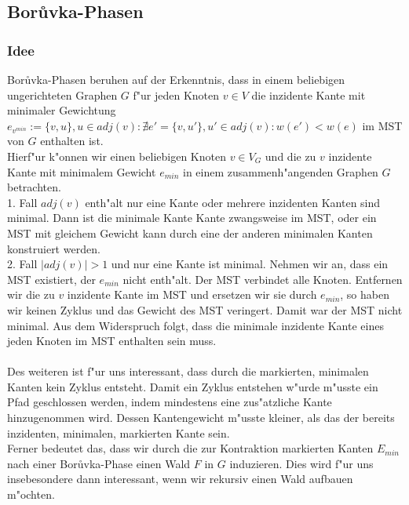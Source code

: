 \subsection{Bor\r uvka-Phasen}

\subsubsection{Idee}
\label{sec:borIdea}

Bor\r uvka-Phasen beruhen auf der Erkenntnis, dass in einem beliebigen 
    ungerichteten Graphen $G$ f"ur jeden Knoten $v \in V$ die inzidente Kante mit 
    minimaler Gewichtung 
    $e_{v^{min}} := \{v, u\}, u \in adj(v): 
        \nexists e' = \{v, u'\}, u' \in adj(v): w(e') < w(e)$
    im MST von $G$ enthalten ist.\\
Hierf"ur k"onnen wir einen beliebigen Knoten $v \in V_G$ und die zu $v$ inzidente
    Kante mit minimalem Gewicht $e_{min}$ in einem 
    zusammenh"angenden Graphen $G$ betrachten.\\
1. Fall $adj(v)$ enth"alt nur eine Kante oder mehrere inzidenten Kanten sind minimal. 
    Dann ist die minimale Kante Kante zwangsweise im 
    MST, oder ein MST mit gleichem Gewicht kann durch eine der anderen minimalen
    Kanten konstruiert werden.\\
2. Fall $|adj(v)| > 1$ und nur eine Kante ist minimal. 
    Nehmen wir an, dass ein MST existiert, der $e_{min}$ 
    nicht enth"alt. 
    Der MST verbindet alle Knoten.
    Entfernen wir die zu $v$ inzidente Kante im MST
    und ersetzen wir sie durch $e_{min}$, so haben wir keinen Zyklus und das
    Gewicht des MST veringert. 
    Damit war der MST nicht minimal.
    Aus dem Widerspruch folgt, dass die minimale inzidente Kante eines jeden
    Knoten im MST enthalten sein muss.\\
\\
Des weiteren ist f"ur uns interessant, dass durch die markierten, minimalen
    Kanten kein Zyklus entsteht. 
    Damit ein Zyklus entstehen w"urde m"usste ein Pfad geschlossen werden, 
    indem mindestens eine zus"atzliche Kante hinzugenommen wird. 
    Dessen Kantengewicht m"usste kleiner, als das der bereits inzidenten, 
    minimalen, markierten Kante sein.\\
Ferner bedeutet das, dass wir durch die zur Kontraktion markierten Kanten
    $E_{min}$ nach einer Bor\r uvka-Phase einen Wald $F$ in $G$ induzieren.
    Dies wird f"ur uns insebesondere dann interessant, wenn
    wir rekursiv einen Wald aufbauen m"ochten.\\
